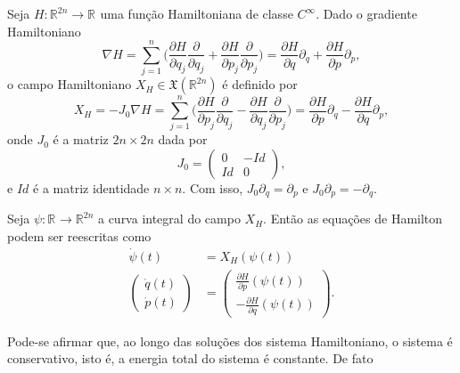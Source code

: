 \documentclass[12pt]{book}
\newcommand{\bigparenteses}[1]{\Big( #1 \Big) }
\newcommand{\campohamiltoniano}[1]{X_{H}(#1)}
\newcommand{\campohamiltonianoabrev}{X_{H}}
\newcommand{\campossuaves}[1]{\mathfrak{X}(#1)}
\newcommand{\derivadaparcial}[2]{\frac{\partial #1}{\partial #2}}
\newcommand{\derivadaparcialabrev}[1]{\partial_{#1}}
\newcommand{\estruturacomplexa}{J_{0}}
\newcommand{\real}[1]{\mathbb{R}^{#1}}
\newcommand{\reta}{\real{}}
\begin{document}
	Seja $H:\real{2n}\to \reta$ uma função Hamiltoniana de classe $C^{\infty}$. Dado o gradiente Hamiltoniano
	$$
	\nabla H =\sum_{j=1}^{n} \bigparenteses{\derivadaparcial{H}{q_{j}}\derivadaparcial{}{q_{j}} + \derivadaparcial{H}{p_{j}}\derivadaparcial{}{p_{j}} }= \derivadaparcial{H}{q}\derivadaparcialabrev{q} + \derivadaparcial{H}{p}\derivadaparcialabrev{p},
	$$
	o campo Hamiltoniano $\campohamiltonianoabrev \in \campossuaves{\real{2n}}$ é definido por 
	$$
	\campohamiltonianoabrev = -\estruturacomplexa \nabla H = \sum_{j=1}^{n}\bigparenteses{\derivadaparcial{H}{p_{j}}\derivadaparcial{}{q_{j}} - \derivadaparcial{H}{q_{j}}\derivadaparcial{}{p_{j}} } = \derivadaparcial{H}{p}\derivadaparcialabrev{q} - \derivadaparcial{H}{q}\derivadaparcialabrev{p}, 
	$$
	onde $\estruturacomplexa$ é a matriz $2n \times 2n$ dada por
	$$
	\estruturacomplexa=
	\left(
	\begin{array}{cc}
	0 & -Id
	\\
	Id & 0
	\end{array}
	\right), 
	$$
	e $Id$ é a matriz identidade $n\times n$. Com isso, $\estruturacomplexa \derivadaparcialabrev{q} = \derivadaparcialabrev{p}$ e $\estruturacomplexa \derivadaparcialabrev{p} = -\derivadaparcialabrev{q}$.
	
	Seja $\psi:\reta \to \real{2n}$ a curva integral do campo $\campohamiltonianoabrev$. Então as equações de Hamilton podem ser reescritas como 
	$$
	\begin{aligned}
	\dot{\psi}(t) &= \campohamiltoniano{\psi(t)}
	\\
	\left(
	\begin{array}{c}
	\dot{q}(t)
	\\
	\dot{p}(t)
	\end{array}
	\right)
	&=
	\left(
	\begin{array}{c}
	\derivadaparcial{H}{p}(\psi(t))
	\\
	-\derivadaparcial{H}{q}(\psi(t))
	\end{array}
	\right).
	\end{aligned}
	$$	
	
	Pode-se afirmar que, ao longo das soluções dos sistema Hamiltoniano, o sistema é conservativo, isto é, a energia total do sistema é constante. De fato
	
\end{document}
